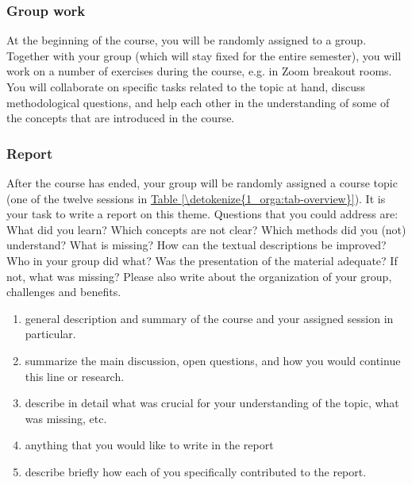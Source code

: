 \documentclass[letterpaper,10pt,english]{sphinxmanual}
\begin{document}
\subsubsection*{Group work}

At the beginning of the course, you will be randomly assigned to a group.
Together with your group (which will stay fixed for the entire semester),
you will work on a number of exercises during the course, e.g. in Zoom breakout rooms.
You will collaborate on specific tasks related to the topic at hand, discuss methodological questions,
and help each other in the understanding of some of the concepts that are introduced in the course.
\subsubsection*{Report}

After the course has ended, your group will be randomly assigned a course topic (one of the twelve sessions in \hyperref[\detokenize{1_orga:tab-overview}]{Table \ref{\detokenize{1_orga:tab-overview}}}).
It is your task to write a report on this theme. Questions that you could address are:
What did you learn? Which concepts are not clear? Which methods did you (not) understand?
What is missing? How can the textual descriptions be improved? Who in your group did what?
Was the presentation of the material adequate? If not, what was missing?
Please also write about the organization of your group, challenges and benefits.

\begin{enumerate}
%
\item {} 
 general description and summary of the course and your assigned session in particular.

\item {} 
 summarize the main discussion, open questions, and how you would continue this line or research.

\item {} 
 describe in detail what was crucial for your understanding of the topic, what was missing, etc.

\item {} 
 anything that you would like to write in the report

\item {} 
 describe briefly how each of you specifically contributed to the report.

\end{enumerate}
\end{document}
